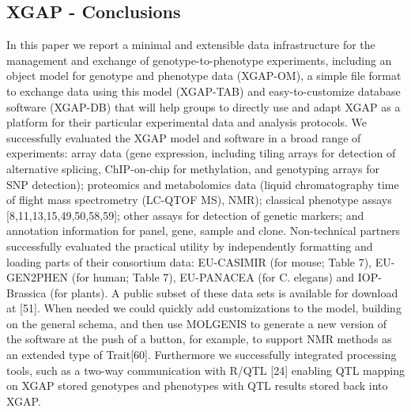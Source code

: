 \documentclass[8pt, twoside, a5paper]{report}
\begin{document}
\subsection{XGAP - Conclusions}
In this paper we report a minimal and extensible data infrastructure for the management and exchange of genotype-to-phenotype experiments, including an object
model for genotype and phenotype data (XGAP-OM), a simple file format to exchange data using this model (XGAP-TAB) and easy-to-customize database software
(XGAP-DB) that will help groups to directly use and adapt XGAP as a platform for their particular experimental data and analysis protocols. We successfully 
evaluated the XGAP model and software in a broad range of experiments: array data (gene expression, including tiling arrays for detection of alternative splicing, 
ChIP-on-chip for methylation, and genotyping arrays for SNP detection); proteomics and metabolomics data (liquid chromatography time of flight mass spectrometry 
(LC-QTOF MS), NMR); classical phenotype assays [8,11,13,15,49,50,58,59]; other assays for detection of genetic markers; and annotation information for panel, gene, 
sample and clone. Non-technical partners successfully evaluated the practical utility by independently formatting and loading parts of their consortium data: 
EU-CASIMIR (for mouse; Table 7), EU-GEN2PHEN (for human; Table 7), EU-PANACEA (for C. elegans) and IOP-Brassica (for plants). A public subset of these data sets 
is available for download at [51]. When needed we could quickly add customizations to the model, building on the general schema, and then use MOLGENIS to generate 
a new version of the software at the push of a button, for example, to support NMR methods as an extended type of Trait[60]. Furthermore we successfully integrated 
processing tools, such as a two-way communication with R/QTL [24] enabling QTL mapping on XGAP stored genotypes and phenotypes with QTL results stored back into XGAP.
\end{document}
